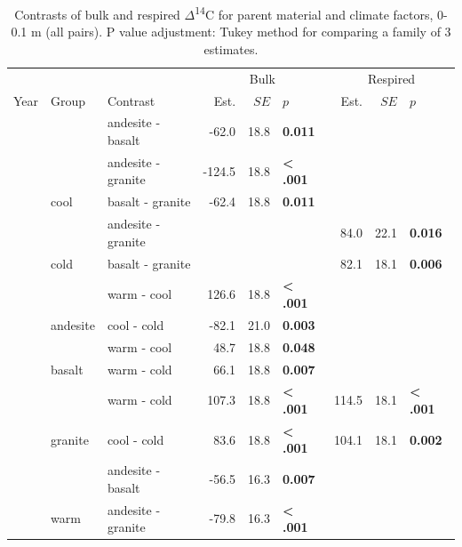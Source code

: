 \documentclass[english,man,floatsintext]{apa6}
\begin{document}
\begin{longtable}[t]{rllrrlrrl}
\caption{\label{tab:blk-inc-contrasts-10}Contrasts of bulk and respired \(\Delta\)\textsuperscript{14}C for parent material and climate factors, 0-0.1 m (all pairs). P value adjustment: Tukey method for comparing a family of 3 estimates.}\\
\toprule
\multicolumn{3}{c}{ } & \multicolumn{3}{c}{Bulk} & \multicolumn{3}{c}{Respired} \\
\cmidrule(l{3pt}r{3pt}){4-6} \cmidrule(l{3pt}r{3pt}){7-9}
Year & Group & Contrast & Est. & $SE$ & $p$ & Est. & $SE$ & $p$\\
\midrule
 &  & andesite - basalt & -62.0 & 18.8 & \textbf{0.011} &  &  & \\
\nopagebreak
 &  & andesite - granite & -124.5 & 18.8 & \textbf{< .001} &  &  & \\
\nopagebreak
 & \multirow[t]{-3}{*}{\raggedright\arraybackslash cool} & basalt - granite & -62.4 & 18.8 & \textbf{0.011} &  &  & \\
\nopagebreak
 &  & andesite - granite &  &  &  & 84.0 & 22.1 & \textbf{0.016}\\
\nopagebreak
 & \multirow[t]{-2}{*}{\raggedright\arraybackslash cold} & basalt - granite &  &  &  & 82.1 & 18.1 & \textbf{0.006}\\
\nopagebreak
 &  & warm - cool & 126.6 & 18.8 & \textbf{< .001} &  &  & \\
\nopagebreak
 & \multirow[t]{-2}{*}{\raggedright\arraybackslash andesite} & cool - cold & -82.1 & 21.0 & \textbf{0.003} &  &  & \\
\nopagebreak
 &  & warm - cool & 48.7 & 18.8 & \textbf{0.048} &  &  & \\
\nopagebreak
 & \multirow[t]{-2}{*}{\raggedright\arraybackslash basalt} & warm - cold & 66.1 & 18.8 & \textbf{0.007} &  &  & \\
\nopagebreak
 &  & warm - cold & 107.3 & 18.8 & \textbf{< .001} & 114.5 & 18.1 & \textbf{< .001}\\
\nopagebreak
\multirow[t]{-11}{*}{\raggedleft\arraybackslash 2001} & \multirow[t]{-2}{*}{\raggedright\arraybackslash granite} & cool - cold & 83.6 & 18.8 & \textbf{< .001} & 104.1 & 18.1 & \textbf{0.002}\\
\cmidrule{1-9}\pagebreak[0]
 &  & andesite - basalt & -56.5 & 16.3 & \textbf{0.007} &  &  & \\
\nopagebreak
 & \multirow[t]{-2}{*}{\raggedright\arraybackslash warm} & andesite - granite & -79.8 & 16.3 & \textbf{< .001} &  &  & \\

\end{longtable}
\end{document}
